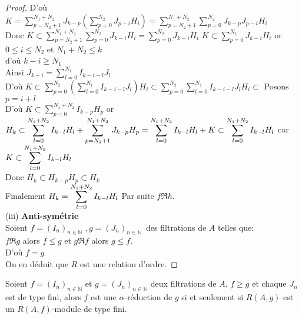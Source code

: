 \begin{proof}
	D'où $K=\displaystyle  \sum_{p=N_{2}+1}^{N_{1}+N_{2}}J_{k-p}(\displaystyle  \sum_{p=0}^{N_{2}}J_{p-i}H_{i})=\displaystyle  \sum_{p=N_{2}+1}^{N_{1}+N_{2}}\displaystyle  \sum_{p=0}^{N_{2}}J_{k-p}J_{p-i}H_{i}$ \\
	Donc $K\subset\displaystyle  \sum_{p=N_{2}+1}^{N_{1}+N_{2}}\displaystyle  \sum_{p=0}^{N_{2}}J_{k-i}H_{i}=\displaystyle  \sum_{p=0}^{N_{2}}J_{k-i}H_{i}$
	$K\subset \displaystyle  \sum_{p=0}^{N_{2}}J_{k-i}H_{i}$
	or $0\leq i\leq N_{2}$ et $N_{1}+N_{2}\leq k$ \\
	d'où $k-i\geq N_{1}$ \\
	Ainsi $J_{k-i}=\displaystyle  \sum_{l=0}^{N_{1}}I_{k-i-l}J_{l}$ \\
	D'où $K\subset\displaystyle  \sum_{p=0}^{N_{2}}(\displaystyle  \sum_{l=0}^{N_{1}}I_{k-i-l}J_{l})H_{i}\subset\displaystyle  \sum_{p=0}^{N_{2}}\displaystyle  \sum_{l=0}^{N_{1}}I_{k-i-l}J_{l}H_{i}\subset $
	Posons $p=i+l$ \\
	D'où $K\subset \displaystyle  \sum_{p=0}^{N_{1}+N_{2}}I_{k-p}H_{p}$
	or $H_{k}\subset
	\displaystyle  \sum_{l=0}^{N_{1}+N_{2}}I_{k-l}H_{l}+\displaystyle  \sum_{p=N_{2}+1}^{N_{1}+N_{2}}J_{k-p}H_{p}=\displaystyle  \sum_{l=0}^{N_{1}+N_{2}}I_{k-l}H_{l}+K\subset \displaystyle  \displaystyle  \sum_{l=0}^{N_{1}+N_{2}}I_{k-l}H_{l}$ car $K\subset \displaystyle  \displaystyle  \sum_{l=0}^{N_{1}+N_{2}}I_{k-l}H_{l}$ \\
	Donc $H_{k}\subset H_{k-p}H_{p}\subset H_{k}$ \\
	Finalement $H_{k}=\displaystyle  \displaystyle  \sum_{l=0}^{N_{1}+N_{2}}I_{k-l}H_{l}$
	Par suite $f \Re h$. \\
	
	(iii) \textbf{Anti-symétrie} \\
	Soient $f=(I_{n})_{n\in \mathbb{N}}$ $,g=(J_{n})_{n\in \mathbb{N} }$\ des filtrations de $A$ telles que: \\
	$f \Re g$ alors $f\leq g$ et $g \Re f$ alors $g\leq f.$ \\
	D'où $f=g$ \\
	On en déduit que $R$ est une relation d'ordre. 
\end{proof}
\begin{maproposition}
	Soient $f=(I_n)_{n \in \mathbb{N}}$ et $g=(J_n)_{n \in \mathbb{N}}$ deux filtrations de $A$. $f \geq g$ et chaque $J_n$ est de type fini, alors $f$ est une $\alpha$-réduction de $g$ si et seulement si $R(A,g)$ est un $R(A,f)$-module de type fini.
\end{maproposition}
